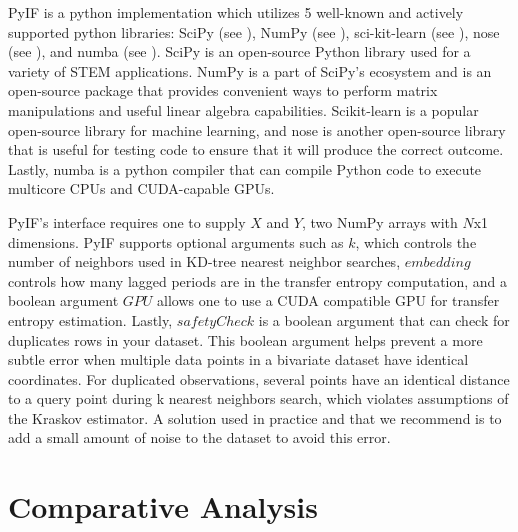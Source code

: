 
PyIF is a python implementation which utilizes 5 well-known and actively supported python libraries: SciPy (see \cite{scipy}),  NumPy (see \cite{numpy}), sci-kit-learn (see \cite{scikit-learn}),  nose (see \cite{nose}), and numba (see \cite{numba}).  SciPy is an open-source Python library used for a variety of STEM applications.  NumPy is a part of SciPy's ecosystem and is an open-source package that provides convenient ways to perform matrix manipulations and useful linear algebra capabilities.  Scikit-learn is a popular open-source library for machine learning, and nose is another open-source library that is useful for testing code to ensure that it will produce the correct outcome.  Lastly, numba is a python compiler that can compile Python code to execute multicore CPUs and CUDA-capable GPUs.


PyIF's interface requires one to supply \(X\) and \(Y\), two NumPy arrays with \(N\)x1 dimensions.  PyIF supports optional arguments such as \(k\), which controls the number of neighbors used in KD-tree nearest neighbor searches,  \(embedding\) controls how many lagged periods are in the transfer entropy computation, and a boolean argument \(GPU\)  allows one to use a CUDA compatible GPU for transfer entropy estimation.  Lastly, \(safetyCheck\) is a boolean argument that can check for duplicates rows in your dataset. This boolean argument helps prevent a more subtle error when multiple data points in a bivariate dataset have identical coordinates. For duplicated observations, several points have an identical distance to a query point during k nearest neighbors search, which violates assumptions of the Kraskov estimator. A solution used in practice and that we recommend is to add a small amount of noise to the dataset to avoid this error.


\section{Comparative Analysis} \label{PyIF:CA}

